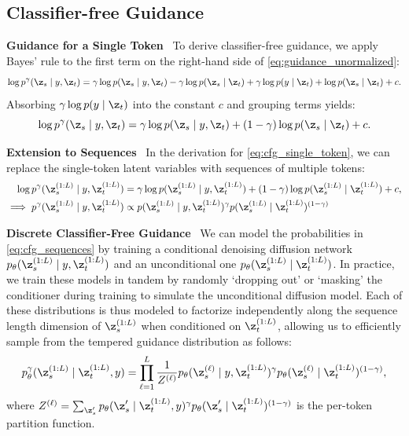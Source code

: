\documentclass{article} %
\begin{document}
\subsection{Classifier-free Guidance}\label{subsec:cfg}
\textbf{Guidance for a Single Token}~
To derive classifier-free guidance, we apply Bayes' rule to the first term on the right-hand side of \eqref{eq:guidance_unormalized}:
\begin{equation*}
    \log p^\gamma(\z_s \mid y, \z_t) = \gamma\log p(\z_s \mid y, \z_t) - \gamma\log p(\z_s \mid \z_t) + \gamma\log p(y\mid \z_t) + \log p(\z_s \mid \z_t) + c. 
\end{equation*}
Absorbing $\gamma\log p(y\mid \z_t)$ into the constant $c$ and grouping terms yields:
\begin{equation}\label{eq:cfg_single_token}
    \log p^\gamma(\z_s \mid y, \z_t) = \gamma\log p(\z_s \mid y, \z_t) + (1-\gamma)\log p(\z_s \mid \z_t) + c.
\end{equation}

\textbf{Extension to Sequences}~
In the derivation for \eqref{eq:cfg_single_token}, we can replace the single-token latent variables with sequences of multiple tokens:
\begin{align}\label{eq:cfg_sequences}
\begin{split}
    \log p^\gamma(\z_s^{(1:L)} \mid y, \z_t^{(1:L)}) &= \gamma\log p(\z_s^{(1:L)} \mid y, \z_t^{(1:L)}) + (1-\gamma)\log p(\z_s^{(1:L)} \mid \z_t^{(1:L)}) + c,\\
    \implies p^\gamma(\z_s^{(1:L)} \mid y, \z_t^{(1:L)}) &\propto p(\z_s^{(1:L)} \mid y, \z_t^{(1:L)})^{\gamma}p(\z_s^{(1:L)} \mid \z_t^{(1:L)})^{(1-\gamma)}
\end{split}
\end{align}

\textbf{Discrete Classifier-Free Guidance}~
We can model the probabilities in \eqref{eq:cfg_sequences} by training a conditional denoising diffusion network $p_\theta(\z_s^{(1:L)} \mid y, \z_t^{(1:L)})$ and an unconditional one $p_\theta(\z_s^{(1:L)} \mid \z_t^{(1:L)})$.
In practice, we train these models in tandem by randomly `dropping out' or `masking' the conditioner during training to simulate the unconditional diffusion model.
Each of these distributions is thus modeled to factorize independently along the sequence length dimension of $\z_s^{(1:L)}$ when conditioned on $\z_t^{(1:L)}$, allowing us to efficiently sample from the tempered guidance distribution as follows:
\begin{align}
    p^\gamma_\theta(\z_s^{(1:L)} \mid \z_t^{(1:L)}, y) = \prod_{\ell=1}^{L}\frac{1}{Z^{(\ell)}}p_\theta(\z_s^{(\ell)} \mid y, \z_t^{(1:L)})^\gamma p_\theta(\z_s^{(\ell)}\mid\z_t^{(1:L)})^{(1-\gamma)},
\end{align}
where $Z^{(\ell)} = \sum_{\z_s'}p_\theta(\z_s' \mid \z_t^{(1:L)}, y)^\gamma p_\theta(\z_s'\mid\z_t^{(1:L)})^{(1-\gamma)}$ is the per-token partition function.
\end{document}
